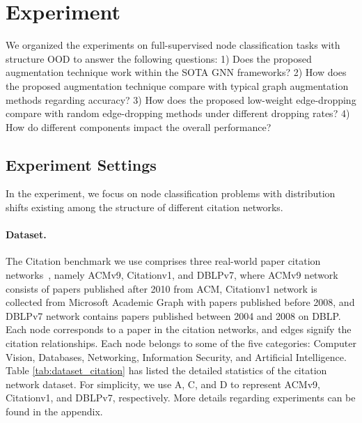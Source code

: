 
\section{Experiment}


We organized the experiments on full-supervised node classification tasks with structure OOD to answer the following questions: 1) Does the proposed augmentation technique work within the SOTA GNN frameworks? 2) How does the proposed augmentation technique compare with typical graph augmentation methods regarding accuracy? 3) How does the proposed low-weight edge-dropping compare with random edge-dropping methods under different dropping rates? 4) How do different components impact the overall performance?





\subsection{Experiment Settings}
In the experiment, we focus on node classification problems with distribution shifts existing among the structure of different citation networks. 
\paragraph{Dataset.}

The Citation benchmark we use comprises three real-world paper citation networks~\cite{shen2020adversarial}, namely ACMv9, Citationv1, and DBLPv7, where ACMv9 network consists of papers published after 2010 from ACM, Citationv1 network is collected from Microsoft Academic Graph with papers published before 2008, and DBLPv7 network contains papers published between 2004 and 2008 on DBLP. Each node corresponds to a paper in the citation networks, and edges signify the citation relationships.  Each node belongs to some of the five categories:  Computer Vision, Databases, Networking, Information Security, and Artificial Intelligence. Table \ref{tab:dataset_citation} has listed the detailed statistics of the citation network dataset.
For simplicity, we use A, C, and D to represent ACMv9, Citationv1, and DBLPv7, respectively. More details regarding experiments can be found in the appendix.
% 

